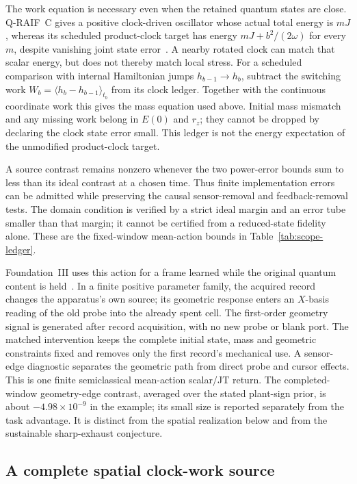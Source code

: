 The work equation is necessary even when the retained quantum states
are close. Q-RAIF~C gives a positive clock-driven oscillator whose
actual total energy is $mJ$, whereas its scheduled product-clock target
has energy $mJ+b^2/(2\omega)$ for every $m$, despite vanishing joint
state error~\cite{QRC}. A nearby rotated clock can match that scalar
energy, but does not thereby match local stress. For a scheduled
comparison with internal Hamiltonian jumps $h_{b-1}\to h_b$, subtract
the switching work
$W_b=\langle h_b-h_{b-1}\rangle_{t_b}$ from its clock ledger.
Together with the continuous coordinate work this gives the mass
equation used above. Initial mass mismatch and any missing work belong
in $E(0)$ and $r_z$; they cannot be dropped by declaring the clock
state error small. This ledger is not the energy expectation of the
unmodified product-clock target.

A source contrast remains nonzero whenever the two power-error bounds
sum to less than its ideal contrast at a chosen time. Thus finite
implementation errors can be admitted while preserving the causal
sensor-removal and feedback-removal tests. The domain condition is
verified by a strict ideal margin and an error tube smaller than that
margin; it cannot be certified from a reduced-state fidelity alone.
These are the fixed-window mean-action bounds in
Table~\ref{tab:scope-ledger}.

Foundation~III uses this action for a frame learned while the original
quantum content is held~\cite{FoundationIII}. In a finite positive
parameter family, the acquired record changes the apparatus's own
source; its geometric response enters an $X$-basis reading of the old
probe into the already spent cell. The first-order geometry signal is
generated after record acquisition, with no new probe or blank port.
The matched intervention keeps the complete
initial state, mass and geometric constraints fixed and removes only
the first record's mechanical use. A sensor-edge diagnostic separates
the geometric path from direct probe and cursor effects. This is one
finite semiclassical mean-action scalar/JT return. The completed-window
geometry-edge contrast, averaged over the stated plant-sign prior,
is about $-4.98\times10^{-9}$ in the example;
its small size is reported separately from the task advantage.
It is distinct from the spatial realization below
and from the sustainable sharp-exhaust conjecture.

\subsection{A complete spatial clock-work source}
\label{sec:spatial-clock-work}

